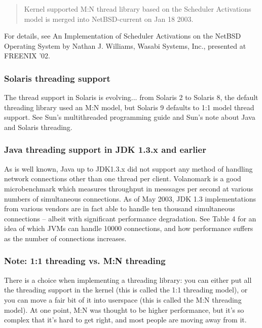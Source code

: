 \documentclass[twoside, xetex]{report}
\begin{document}
\begin{quotation}
Kernel supported M:N thread library based on the Scheduler Activations model is merged into NetBSD-current on Jan 18 2003.
\end{quotation}

For details, see An Implementation of Scheduler Activations on the NetBSD Operating System by Nathan J. Williams, Wasabi Systems, Inc., presented at FREENIX '02.

\subsubsection*{Solaris threading support}

The thread support in Solaris is evolving... from Solaris 2 to Solaris 8, the default threading library used an M:N model, but Solaris 9 defaults to 1:1 model thread support. See Sun's multithreaded programming guide and Sun's note about Java and Solaris threading.

\subsubsection*{Java threading support in JDK 1.3.x and earlier}

As is well known, Java up to JDK1.3.x did not support any method of handling network connections other than one thread per client. Volanomark is a good microbenchmark which measures throughput in messsages per second at various numbers of simultaneous connections. As of May 2003, JDK 1.3 implementations from various vendors are in fact able to handle ten thousand simultaneous connections -- albeit with significant performance degradation. See Table 4 for an idea of which JVMs can handle 10000 connections, and how performance suffers as the number of connections increases.

\subsubsection*{Note: 1:1 threading vs. M:N threading}

There is a choice when implementing a threading library: you can either put all the threading support in the kernel (this is called the 1:1 threading model), or you can move a fair bit of it into userspace (this is called the M:N threading model). At one point, M:N was thought to be higher performance, but it's so complex that it's hard to get right, and most people are moving away from it.
\end{document}

